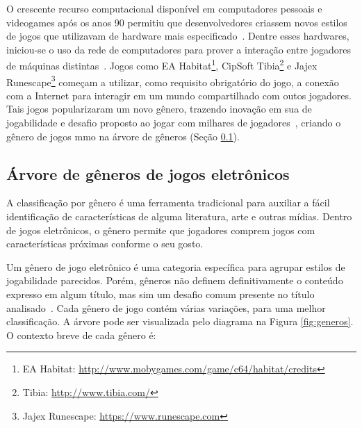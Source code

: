 O crescente recurso computacional disponível em computadores pessoais e videogames após os anos 90 permitiu que desenvolvedores criassem novos estilos de jogos que utilizavam de hardware mais especificado~\cite{adams_1208533}.
%
Dentre esses hardwares, iniciou-se o uso da rede de computadores para prover a interação entre jogadores de máquinas distintas~\cite{statisita_consumo_rede}.
%
Jogos como EA Habitat\footnote{EA Habitat: \url{http://www.mobygames.com/game/c64/habitat/credits}}, CipSoft Tibia\footnote{Tibia: \url{http://www.tibia.com/}} e Jajex Runescape\footnote{Jajex Runescape: \url{https://www.runescape.com}} começam a utilizar, como requisito obrigatório do jogo, a conexão com a Internet para interagir em um mundo compartilhado com outos jogadores.
%
Tais jogos popularizaram um novo gênero, trazendo inovação em sua de jogabilidade e desafio proposto ao jogar com milhares de jogadores~\cite{guinness_runescape, 1417630}, criando o gênero de jogos \ac{mmo} na árvore de gêneros (Seção \ref{sec:arvore_generos}).



\subsection{Árvore de gêneros de jogos eletrônicos}
\label{sec:arvore_generos}


A classificação por gênero é uma ferramenta tradicional para auxiliar a fácil identificação de características de alguma literatura, arte e outras mídias.
%
Dentro de jogos eletrônicos, o gênero permite que jogadores comprem jogos com características próximas conforme o seu gosto\cite{Clarke2015}.



Um gênero de jogo eletrônico é uma categoria específica para agrupar estilos de jogabilidade parecidos.
%
Porém, gêneros não definem definitivamente o conteúdo expresso em algum título, mas sim um desafio comum presente no título analisado~\cite{adams_1208533, video_game_technologies}.
%
Cada gênero de jogo contém várias variações, para uma melhor classificação.
%
A árvore pode ser visualizada pelo diagrama na Figura \ref{fig:generos}.
%
O contexto breve de cada gênero é:




